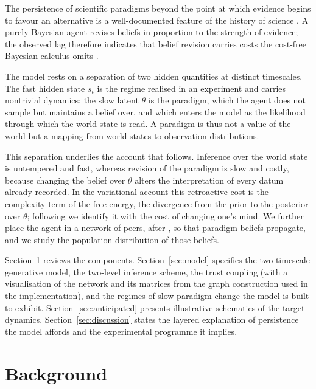 \documentclass[11pt,a4paper]{article}
\newcommand{\theory}{\theta}
\begin{document}
The persistence of scientific paradigms beyond the point at which evidence begins
to favour an alternative is a well-documented feature of the history of science
\citep{kuhn1962Structure,planck1949Autobiography}. A purely Bayesian agent revises
beliefs in proportion to the strength of evidence; the observed lag therefore
indicates that belief revision carries costs the cost-free Bayesian calculus omits
\citep{hylandAlbarracin2025MindChange}.

The model rests on a separation of two hidden quantities at distinct timescales. The
fast hidden state $s_t$ is the regime realised in an experiment and carries nontrivial
dynamics; the slow latent $\theory$ is the paradigm, which the agent does not sample
but maintains a belief over, and which enters the model as the likelihood through
which the world state is read. A paradigm is thus not a value of the world but a
mapping from world states to observation distributions.

This separation underlies the account that follows. Inference over the world state
is untempered and fast, whereas revision of the paradigm is slow and costly,
because changing the belief over $\theory$ alters the interpretation of every datum
already recorded. In the variational account this retroactive cost is the
complexity term of the free energy, the divergence from the prior to the posterior
over $\theory$; following \citet{hylandAlbarracin2025MindChange} we identify it
with the cost of changing one's mind. We further place the agent in a network of peers, after
\citet{albarracin2022EpistemicCommunities}, so that paradigm beliefs propagate, and
we study the population distribution of those beliefs.

Section~\ref{sec:background} reviews the components. Section~\ref{sec:model}
specifies the two-timescale generative model, the two-level inference scheme, the
trust coupling (with a visualisation of the network and its matrices from the graph
construction used in the implementation), and the regimes of slow paradigm change
the model is built to exhibit. Section~\ref{sec:anticipated} presents illustrative
schematics of the target dynamics. Section~\ref{sec:discussion} states the
layered explanation of persistence the model affords and the experimental
programme it implies.

\section{Background}
\label{sec:background}
\end{document}
